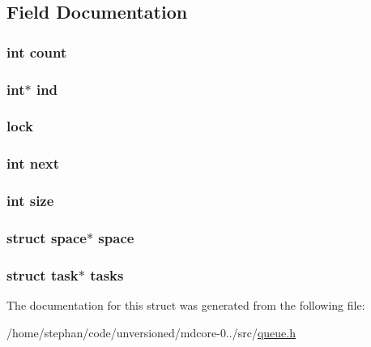 \subsection{Field Documentation}
\hypertarget{structqueue_ad43c3812e6d13e0518d9f8b8f463ffcf}{
\subsubsection[{count}]{\setlength{\rightskip}{0pt plus 5cm}int count}}\label{structqueue_ad43c3812e6d13e0518d9f8b8f463ffcf}
\hypertarget{structqueue_abf6fe97795b10bba2698b51120e35186}{
\subsubsection[{ind}]{\setlength{\rightskip}{0pt plus 5cm}int$\ast$ ind}}\label{structqueue_abf6fe97795b10bba2698b51120e35186}
\hypertarget{structqueue_ad30fc7af2401a1e1b6b9152df1646ac4}{
\subsubsection[{lock}]{ lock}}\label{structqueue_ad30fc7af2401a1e1b6b9152df1646ac4}
\hypertarget{structqueue_a142a1b51e133e50c0a72b175958ac412}{
\subsubsection[{next}]{\setlength{\rightskip}{0pt plus 5cm}int next}}\label{structqueue_a142a1b51e133e50c0a72b175958ac412}
\hypertarget{structqueue_a439227feff9d7f55384e8780cfc2eb82}{
\subsubsection[{size}]{\setlength{\rightskip}{0pt plus 5cm}int size}}\label{structqueue_a439227feff9d7f55384e8780cfc2eb82}
\hypertarget{structqueue_a7bfa55c955401f156a7a8cfada4a0ed5}{
\subsubsection[{space}]{\setlength{\rightskip}{0pt plus 5cm}struct {\bf space}$\ast$ {\bf space}}}\label{structqueue_a7bfa55c955401f156a7a8cfada4a0ed5}
\hypertarget{structqueue_ace3a87c7e253bce95072d59dfcb2622f}{
\subsubsection[{tasks}]{\setlength{\rightskip}{0pt plus 5cm}struct {\bf task}$\ast$ tasks}}\label{structqueue_ace3a87c7e253bce95072d59dfcb2622f}


The documentation for this struct was generated from the following file\-:\begin{DoxyCompactItemize}
\item 
/home/stephan/code/unversioned/mdcore-\/0../src/\hyperlink{queue_8h}{queue.\-h}\end{DoxyCompactItemize}
